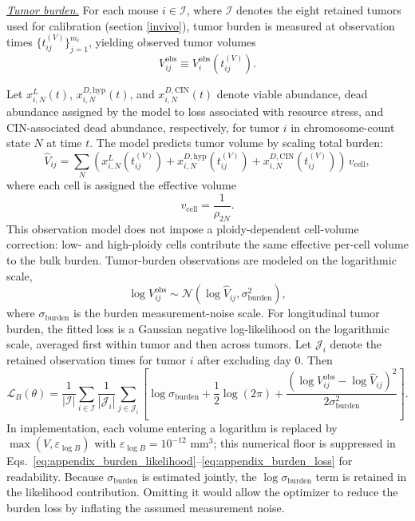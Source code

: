 \documentclass[11pt]{article}
\begin{document}
\underline{\textit{Tumor burden.}} For each mouse $i\in\mathcal I$, where $\mathcal I$ denotes the eight retained tumors used for calibration (section \ref{invivo}), tumor burden is measured at observation times $\{t_{ij}^{(V)}\}_{j=1}^{m_i}$, yielding observed tumor volumes
\begin{equation}
V_{ij}^{\mathrm{obs}} \equiv V_i^{\mathrm{obs}}(t_{ij}^{(V)}).
\label{eq:appendix_observed_volume_definition}
\end{equation}

Let $x^{L}_{i,N}(t)$, $x^{D,\mathrm{hyp}}_{i,N}(t)$, and $x^{D,\mathrm{CIN}}_{i,N}(t)$ denote viable abundance, dead abundance assigned by the model to loss associated with resource stress, and CIN-associated dead abundance, respectively, for tumor $i$ in chromosome-count state $N$ at time $t$. The model predicts tumor volume by scaling total burden:
\begin{equation}
\widehat V_{ij}
=
\sum_{N}
\left(
x^{L}_{i,N}(t_{ij}^{(V)})
+
x^{D,\mathrm{hyp}}_{i,N}(t_{ij}^{(V)})
+
x^{D,\mathrm{CIN}}_{i,N}(t_{ij}^{(V)})
\right)
\,v_{\mathrm{cell}},
\label{eq:appendix_pred_volume}
\end{equation}
where each cell is assigned the effective volume
\begin{equation}
v_{\mathrm{cell}}
=
\frac{1}{\rho_{2N}}.
\label{eq:appendix_cell_volume_scale}
\end{equation}
This observation model does not impose a ploidy-dependent cell-volume correction: low- and high-ploidy cells contribute the same effective per-cell volume to the bulk burden.
Tumor-burden observations are modeled on the logarithmic scale,
\begin{equation}
\log V_{ij}^{\mathrm{obs}}
\sim
\mathcal N
\!\left(
\log \widehat V_{ij},
\sigma_{\mathrm{burden}}^2
\right),
\label{eq:appendix_burden_likelihood}
\end{equation}
where $\sigma_{\mathrm{burden}}$ is the burden measurement-noise scale. For longitudinal tumor burden, the fitted loss is a Gaussian negative log-likelihood on the logarithmic scale, averaged first within tumor and then across tumors. Let $\mathcal J_i$ denote the retained observation times for tumor $i$ after excluding day 0. Then
\begin{equation}
\mathcal L_B(\theta)
=
\frac{1}{|\mathcal I|}
\sum_{i\in\mathcal I}
\frac{1}{|\mathcal J_i|}
\sum_{j\in\mathcal J_i}
\left[
\log \sigma_{\mathrm{burden}}
+
\frac{1}{2}\log(2\pi)
+
\frac{
\left(
\log V_{ij}^{\mathrm{obs}}
-
\log \widehat V_{ij}
\right)^2
}{
2\sigma_{\mathrm{burden}}^2
}
\right].
\label{eq:appendix_burden_loss}
\end{equation}
In implementation, each volume entering a logarithm is replaced by $\max(V,\varepsilon_{\log B})$ with $\varepsilon_{\log B}=10^{-12}$ mm$^3$; this numerical floor is suppressed in Eqs.~\eqref{eq:appendix_burden_likelihood}--\eqref{eq:appendix_burden_loss} for readability. Because $\sigma_{\mathrm{burden}}$ is estimated jointly, the $\log \sigma_{\mathrm{burden}}$ term is retained in the likelihood contribution. Omitting it would allow the optimizer to reduce the burden loss by inflating the assumed measurement noise.
\end{document}
